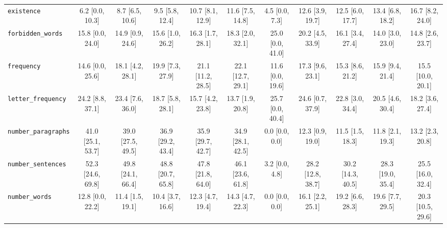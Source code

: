 \documentclass{article}
\begin{document}
\begin{table}[h]
{\begin{tabular}{lcccccccccc}
\texttt{existence} & 6.2 [0.0, 10.3] & 8.7 [6.5, 10.6] & 9.5 [5.8, 12.4] & 10.7 [8.1, 12.9] & 11.6 [7.5, 14.8] & 4.5 [0.0, 7.3] & 12.6 [3.9, 19.7] & 12.5 [6.0, 17.7] & 13.4 [6.8, 18.2] & 16.7 [8.2, 24.0] \\
\texttt{forbidden\_words} & 15.8 [0.0, 24.0] & 14.9 [0.9, 24.6] & 15.6 [1.0, 26.2] & 16.3 [1.7, 28.1] & 18.3 [2.0, 32.1] & 25.0 [0.0, 41.0] & 20.2 [4.5, 33.9] & 16.1 [3.4, 27.4] & 14.0 [3.0, 23.0] & 14.8 [2.6, 23.7] \\
\texttt{frequency} & 14.6 [0.0, 25.6] & 18.1 [4.2, 28.1] & 19.9 [7.3, 27.9] & 21.1 [11.2, 28.5] & 22.1 [12.7, 29.1] & 11.6 [0.0, 19.6] & 17.3 [9.6, 23.1] & 15.3 [8.6, 21.2] & 15.9 [9.4, 21.4] & 15.5 [10.0, 20.1] \\
\texttt{letter\_frequency} & 24.2 [8.8, 37.1] & 23.4 [7.6, 36.0] & 18.7 [5.8, 28.1] & 15.7 [4.2, 23.8] & 13.7 [1.9, 20.8] & 25.7 [0.0, 40.4] & 24.6 [0.7, 37.9] & 22.8 [3.0, 34.4] & 20.5 [4.6, 30.4] & 18.2 [3.6, 27.4] \\
\texttt{number\_paragraphs} & 41.0 [25.1, 53.7] & 39.0 [27.5, 49.5] & 36.9 [29.2, 43.4] & 35.9 [29.7, 42.7] & 34.9 [28.1, 42.5] & 0.0 [0.0, 0.0] & 12.3 [0.9, 19.0] & 11.5 [1.5, 18.3] & 11.8 [2.1, 19.3] & 13.2 [2.3, 20.8] \\
\texttt{number\_sentences} & 52.3 [24.6, 69.8] & 49.8 [24.1, 66.4] & 48.8 [20.7, 65.8] & 47.8 [21.8, 64.0] & 46.1 [23.6, 61.8] & 3.2 [0.0, 4.8] & 28.2 [12.8, 38.7] & 30.2 [14.3, 40.5] & 28.3 [19.0, 35.4] & 25.5 [16.0, 32.4] \\
\texttt{number\_words} & 12.8 [0.0, 22.2] & 11.4 [1.5, 19.1] & 10.4 [3.7, 16.6] & 12.3 [4.7, 19.4] & 14.3 [4.7, 22.3] & 0.0 [0.0, 0.0] & 16.1 [2.2, 25.1] & 19.2 [6.6, 28.3] & 19.6 [7.7, 29.5] & 20.3 [10.5, 29.6] \\
\bottomrule
\end{tabular}
}
\end{table}
\end{document}

